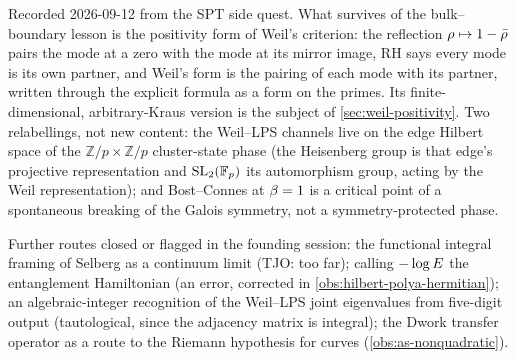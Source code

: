 Recorded 2026-09-12 from the SPT side quest. What survives of the
bulk--boundary lesson is the positivity form of Weil's criterion: the
reflection $\rho\mapsto1-\bar{\rho}$ pairs the mode at a zero with the mode at
its mirror image, RH says every mode is its own partner, and Weil's form is
the pairing of each mode with its partner, written through the explicit
formula as a form on the primes. Its finite-dimensional, arbitrary-Kraus
version is the subject of \cref{sec:weil-positivity}. Two relabellings, not new
content: the Weil--LPS channels live on the edge Hilbert space of the
$\mathbb Z/p\times\mathbb Z/p$ cluster-state phase (the Heisenberg group is
that edge's projective representation and $\mathrm{SL}_2(\mathbb F_p)$ its automorphism group,
acting by the Weil representation); and Bost--Connes at $\beta=1$ is a
critical point of a spontaneous breaking of the Galois symmetry, not a
symmetry-protected phase.

Further routes closed or flagged in the founding session: the functional
integral framing of Selberg as a continuum limit (TJO: too far); calling
$-\log E$ the entanglement Hamiltonian (an error, corrected in
\cref{obs:hilbert-polya-hermitian}); an algebraic-integer recognition of the
Weil--LPS joint eigenvalues from five-digit output (tautological, since the
adjacency matrix is integral); the Dwork transfer operator as a route to the
Riemann hypothesis for curves (\cref{obs:as-nonquadratic}).
